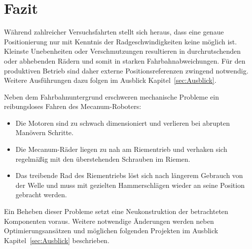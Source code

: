 
\section{Fazit}

Während zahlreicher Versuchsfahrten stellt sich heraus, dass eine  genaue Positionierung nur mit Kenntnis der Radgeschwindigkeiten keine möglich ist. Kleinste Unebenheiten oder Verschmutzungen resultieren in durchrutschenden oder abhebenden Rädern und somit in starken Fahrbahnabweichungen. Für den produktiven Betrieb sind daher externe Positionsreferenzen zwingend notwendig. Weitere Ausführungen dazu folgen im Ausblick Kapitel~\ref{sec:Ausblick}.

Neben dem Fahrbahnuntergrund erschweren mechanische Probleme ein reibungsloses Fahren des Mecanum-Roboters: 

\begin{itemize}
    \item Die Motoren sind zu schwach dimensioniert und verlieren bei abrupten Manövern Schritte.
    \item Die Mecanum-Räder liegen zu nah am Riementrieb und verhaken sich regelmäßig mit den überstehenden Schrauben im Riemen.
    \item Das treibende Rad des Riementriebs löst sich nach längerem Gebrauch von der Welle und muss mit gezielten Hammerschlägen wieder an seine Position gebracht werden.
\end{itemize}

Ein Beheben dieser Probleme setzt eine Neukonstruktion der betrachteten Komponenten voraus. Weitere notwendige Änderungen werden neben Optimierungsansätzen und möglichen folgenden Projekten im Ausblick Kapitel~\ref{sec:Ausblick} beschrieben.
